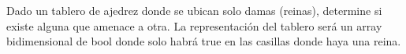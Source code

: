 Dado un tablero de ajedrez donde se ubican solo damas (reinas), determine si existe alguna que amenace a otra. La representación del tablero será un array bidimensional de bool donde solo habrá true en las casillas donde haya una reina.

